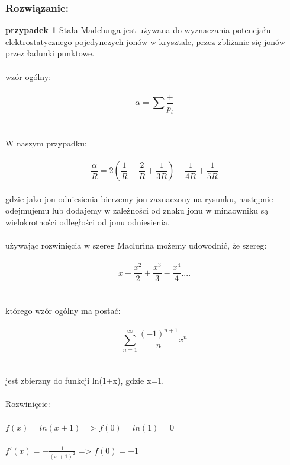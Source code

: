 \subsubsection*{Rozwiązanie:}
\textbf{przypadek 1}
Stała Madelunga jest używana do wyznaczania potencjału elektrostatycznego pojedynczych jonów w krysztale, przez zbliżanie się jonów przez ładunki punktowe. 
\\
\\
wzór ogólny:
\\
\\
\begin{equation}
\alpha=\sum \frac {\pm}{p_i}
\end{equation}
\\
\\
W naszym przypadku: 
\\
\\
\begin{equation}
\frac{\alpha}{R}=2(\frac{1}{R}-\frac{2}{R}+\frac{1}{3R})-\frac{1}{4R}+\frac{1}{5R}
\end{equation}
\\
gdzie jako jon odniesienia bierzemy jon zaznaczony na rysunku, następnie odejmujemu lub dodajemy w zależności od znaku jonu w minaowniku są wielokrotności odległości od jonu odniesienia.
\\
\\
używając rozwinięcia w szereg Maclurina możemy udowodnić, że szereg:
\\
\\
\begin{equation}
x-\frac{x^2}{2}+\frac{x^3}{3}-\frac{x^4}{4}....
\end{equation}
\\
\\
którego wzór ogólny ma postać:
\\
\\
\begin{equation}
\sum_{n=1}^{\infty}\frac{(-1)^{n+1}}{n}x^n
\end{equation}
\\
\\
jest zbierzny do funkcji ln(1+x), gdzie x=1.
\\
\\
Rozwinięcie:
\\
\\
$f(x)=ln(x+1)$   =>   $f(0)=ln(1)=0$
\\
\\
$f'(x)=-\frac{1}{(x+1)^2}$   =>   $f(0)=-1$
\\
\\
